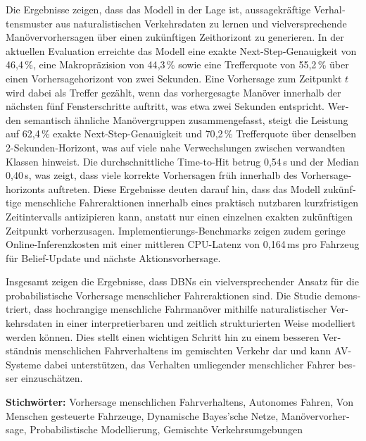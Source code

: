 \begin{otherlanguage}{ngerman}
\par Die Ergebnisse zeigen, dass das Modell in der Lage ist, aussagekräftige Verhaltensmuster aus naturalistischen Verkehrsdaten zu lernen und vielversprechende Manövervorhersagen über einen zukünftigen Zeithorizont zu generieren. In der aktuellen Evaluation erreichte das Modell eine exakte Next-Step-Genauigkeit von 46{,}4\,\%, eine Makropräzision von 44{,}3\,\% sowie eine Trefferquote von 55{,}2\,\% über einen Vorhersagehorizont von zwei Sekunden. Eine Vorhersage zum Zeitpunkt \(t\) wird dabei als Treffer gezählt, wenn das vorhergesagte Manöver innerhalb der nächsten fünf Fensterschritte auftritt, was etwa zwei Sekunden entspricht. Werden semantisch ähnliche Manövergruppen zusammengefasst, steigt die Leistung auf 62{,}4\,\% exakte Next-Step-Genauigkeit und 70{,}2\,\% Trefferquote über denselben 2-Sekunden-Horizont, was auf viele nahe Verwechslungen zwischen verwandten Klassen hinweist. Die durchschnittliche Time-to-Hit betrug 0{,}54\,s und der Median 0{,}40\,s, was zeigt, dass viele korrekte Vorhersagen früh innerhalb des Vorhersagehorizonts auftreten. Diese Ergebnisse deuten darauf hin, dass das Modell zukünftige menschliche Fahreraktionen innerhalb eines praktisch nutzbaren kurzfristigen Zeitintervalls antizipieren kann, anstatt nur einen einzelnen exakten zukünftigen Zeitpunkt vorherzusagen. Implementierungs-Benchmarks zeigen zudem geringe Online-Inferenzkosten mit einer mittleren CPU-Latenz von 0{,}164\,ms pro Fahrzeug für Belief-Update und nächste Aktionsvorhersage.
\par Insgesamt zeigen die Ergebnisse, dass \acp{DBN} ein vielversprechender Ansatz für die probabilistische Vorhersage menschlicher Fahreraktionen sind. Die Studie demonstriert, dass hochrangige menschliche Fahrmanöver mithilfe naturalistischer Verkehrsdaten in einer interpretierbaren und zeitlich strukturierten Weise modelliert werden können. Dies stellt einen wichtigen Schritt hin zu einem besseren Verständnis menschlichen Fahrverhaltens im gemischten Verkehr dar und kann \ac{AV}-Systeme dabei unterstützen, das Verhalten umliegender menschlicher Fahrer besser einzuschätzen.

\vfill
\noindent\textbf{Stichwörter:}  Vorhersage menschlichen Fahrverhaltens, Autonomes Fahren, Von Menschen gesteuerte Fahrzeuge, Dynamische Bayes’sche Netze, Manövervorhersage, Probabilistische Modellierung, Gemischte Verkehrsumgebungen
\vfill
\acresetall
\end{otherlanguage}
